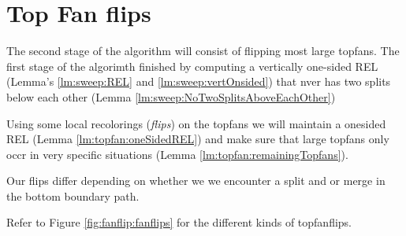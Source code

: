 
\section{Top Fan flips}

The second stage of the algorithm will consist of flipping most large topfans. The first stage of the algorimth finished by computing a vertically one-sided REL (Lemma's \ref{lm:sweep:REL} and \ref{lm:sweep:vertOnsided}) that nver has two splits below each other (Lemma \ref{lm:sweep:NoTwoSplitsAboveEachOther})

Using some local recolorings (\emph{flips}) on the topfans we will maintain a onesided REL (Lemma \ref{lm:topfan:oneSidedREL}) and make sure that large topfans only occr in very specific situations (Lemma \ref{lm:topfan:remainingTopfans}).


Our flips differ depending on whether we we encounter a split and or merge in the bottom boundary path.


Refer to Figure \ref{fig:fanflip:fanflips} for the different kinds of topfanflips.


